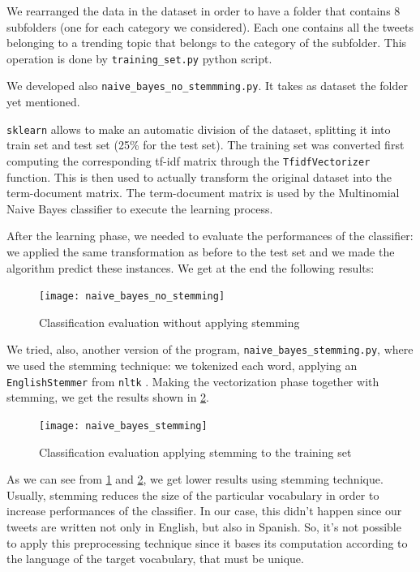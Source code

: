 \documentclass[journal,11pt]{vgtc}
\begin{document}
We rearranged the data in the dataset in order to have a folder that contains 8 subfolders (one for each
category we considered). Each one contains all the tweets belonging to a trending topic that belongs to the category of the subfolder.
This operation is done by \texttt{training\_set.py} python script.

We developed also \texttt{naive\_bayes\_no\_stemmming.py}. It takes as dataset the folder yet mentioned.

\texttt{sklearn} allows to make an automatic division of the dataset, splitting it into train set and
test set (25\% for the test set).
The training set was converted first computing the corresponding tf-idf matrix through the \texttt{TfidfVectorizer} function.
This is then used to actually transform the original dataset into the term-document matrix.
The term-document matrix is used by the Multinomial Naive Bayes classifier to execute the learning process.

After the learning phase, we needed to evaluate the performances of the classifier: we applied the same transformation as before
to the test set and we made the algorithm predict these instances. We get at the end the following results:

\begin{figure}[h]
 \centering
 \texttt{[image: naive\_bayes\_no\_stemming]}
 \caption{Classification evaluation without applying stemming}
 \label{no-stemming}
\end{figure}

We tried, also, another version of the program, \texttt{naive\_bayes\_stemming.py}, where we used the stemming technique:
we tokenized each word, applying an \texttt{EnglishStemmer} from \texttt{nltk} \cite{nltk}.
Making the vectorization phase together with stemming, we get the results shown in \ref{stemming}.

\begin{figure}[h]
 \centering
 \texttt{[image: naive\_bayes\_stemming]}
 \caption{Classification evaluation applying stemming to the training set}
 \label{stemming}
\end{figure}

As we can see from \ref{no-stemming} and \ref{stemming}, we get lower results using stemming technique. Usually, stemming reduces the size of the particular vocabulary in order to increase performances of the classifier. In our case, this didn't happen since our tweets are written not only in English, but also in Spanish. So, it's not possible to apply this preprocessing technique since it bases its computation according to the language of the target vocabulary, that must be unique.
\end{document}
